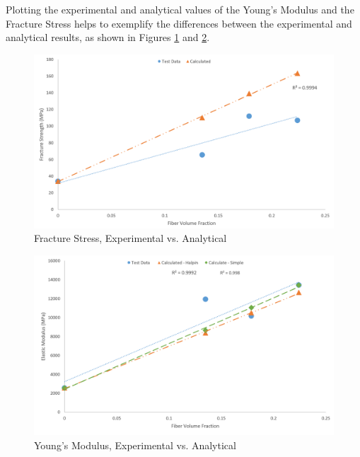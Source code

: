 \documentclass[11pt]{article}
\begin{document}
Plotting the experimental and analytical values of the Young's Modulus and the Fracture Stress helps to exemplify the differences between the experimental and analytical results, as shown in Figures \ref{FScompare} and \ref{ModulusCompare}.

\begin{figure}[H]
\centering
\includegraphics[width=.95\linewidth]{figures/fracture_stress_test_vs_calc.png}
\caption{Fracture Stress, Experimental vs. Analytical}
\label{FScompare}
\end{figure}

\begin{figure}[H]
\centering
\includegraphics[width=.95\linewidth]{figures/modulus_test_vs_calc.png}
\caption{Young's Modulus, Experimental vs. Analytical}
\label{ModulusCompare}
\end{figure}
\end{document}

